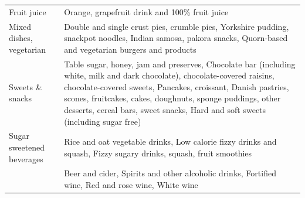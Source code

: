 \documentclass[sn-basic,Numbered,pdflatex]{sn-jnl}
\begin{document}
\begin{longtable}{@{\extracolsep{\fill}}>{\raggedright\arraybackslash}p{}>{\raggedright\arraybackslash}p{}}
Fruit juice & Orange, grapefruit drink and 100\% fruit juice \\ 
Mixed dishes, vegetarian & Double and single crust pies, crumble pies, Yorkshire pudding, snackpot noodles,
  Indian samosa, pakora snacks, Quorn-based and vegetarian burgers and products \\ 
Sweets \& snacks & Table sugar, honey, jam and preserves,
  Chocolate bar (including white, milk and dark chocolate), chocolate-covered raisins, chocolate-covered sweets,
  Pancakes, croissant, Danish pastries, scones, fruitcakes, cakes, doughnuts, sponge puddings, other desserts, cereal bars, sweet snacks,
  Hard and soft sweets (including sugar free) \\ 
Sugar sweetened beverages & Rice and oat vegetable drinks, Low calorie fizzy drinks and squash, Fizzy sugary drinks, squash, fruit smoothies \\ 
{\bfseries Alcoholic beverages} & Beer and cider, Spirits and other alcoholic drinks, Fortified wine, Red and rose wine, White wine \\ 
\bottomrule
\end{longtable}
\endgroup

\newpage
\end{document}

